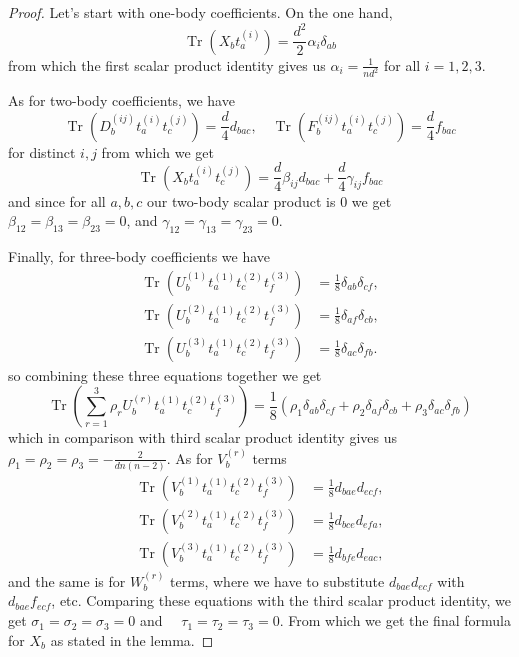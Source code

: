 \documentclass[11pt,letterpaper]{article}
\theoremstyle{plain}
\theoremstyle{plain}
\theoremstyle{plain}
\theoremstyle{plain}
\theoremstyle{plain}
\theoremstyle{plain}
\theoremstyle{plain}
\theoremstyle{definition}
\theoremstyle{plain}
\begin{document}
\begin{proof}
Let's start with one-body coefficients. On the one hand,
\[
    \operatorname{Tr}\left(X_b t_a^{(i)}\right)=\frac{d^2}{2} \alpha_i \delta_{a b}
\]
from which the first scalar product identity gives us $\alpha_i=\frac{1}{n d^2}$ for all $i=1,2,3$. 

As for two-body coefficients, we have
\[
    \operatorname{Tr}\left(D_b^{(i j)} t_a^{(i)} t_c^{(j)}\right)=\frac{d}{4} d_{b a c}, \quad \operatorname{Tr}\left(F_b^{(i j)} t_a^{(i)} t_c^{(j)}\right)=\frac{d}{4} f_{b a c}
\]
for distinct $i, j$ from which we get
\[
    \operatorname{Tr}\left(X_b t_a^{(i)} t_c^{(j)}\right)=\frac{d}{4} \beta_{i j} d_{b a c}+\frac{d}{4} \gamma_{i j} f_{b a c}
\]
and since for all $a, b, c$ our two-body scalar product is $0$ we get $\beta_{12}=\beta_{13}=\beta_{23}=0$, and $\gamma_{12}=\gamma_{13}=\gamma_{23}=0$. 

Finally, for three-body coefficients we have
\[
    \begin{aligned}
    \operatorname{Tr}\left(U_b^{(1)} t_a^{(1)} t_c^{(2)} t_f^{(3)}\right) & =\frac{1}{8} \delta_{a b} \delta_{c f}, \\
    \operatorname{Tr}\left(U_b^{(2)} t_a^{(1)} t_c^{(2)} t_f^{(3)}\right) & =\frac{1}{8} \delta_{a f} \delta_{c b}, \\
    \operatorname{Tr}\left(U_b^{(3)} t_a^{(1)} t_c^{(2)} t_f^{(3)}\right) & =\frac{1}{8} \delta_{a c} \delta_{f b} .
    \end{aligned}
\]
so combining these three equations together we get
\[
    \operatorname{Tr}\left(\sum_{r=1}^3 \rho_r U_b^{(r)} t_a^{(1)} t_c^{(2)} t_f^{(3)}\right)=\frac{1}{8}\left(\rho_1 \delta_{a b} \delta_{c f}+\rho_2 \delta_{a f} \delta_{c b}+\rho_3 \delta_{a c} \delta_{f b}\right)
\]
which in comparison with third scalar product identity gives us $\rho_1=\rho_2=\rho_3=-\frac{2}{d n(n-2)}$. 
As for $V_b^{(r)}$ terms
\[
    \begin{aligned}
    \operatorname{Tr}\left(V_b^{(1)} t_a^{(1)} t_c^{(2)} t_f^{(3)}\right) & =\frac{1}{8} d_{b a e} d_{e c f}, \\
    \operatorname{Tr}\left(V_b^{(2)} t_a^{(1)} t_c^{(2)} t_f^{(3)}\right) & =\frac{1}{8} d_{b c e} d_{e f a}, \\
    \operatorname{Tr}\left(V_b^{(3)} t_a^{(1)} t_c^{(2)} t_f^{(3)}\right) & =\frac{1}{8} d_{b f e} d_{e a c},
    \end{aligned}
\]
and the same is for $W_b^{(r)}$ terms, where we have to substitute $d_{b a e} d_{e c f}$ with $d_{b a e} f_{e c f}$, etc.
Comparing these equations with the third scalar product identity, we get $\sigma_1=\sigma_2=\sigma_3=0$ and $\quad \tau_1=\tau_2=\tau_3=0$.
From which we get the final formula for $X_b$ as stated in the lemma. 
\end{proof}
\end{document}
